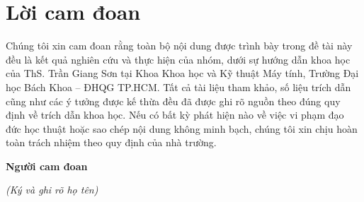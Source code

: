 \chapter*{Lời cam đoan}
\thispagestyle{empty}

Chúng tôi xin cam đoan rằng toàn bộ nội dung được trình bày trong đề tài này đều là kết quả nghiên cứu và thực hiện của nhóm, dưới sự hướng dẫn khoa học của ThS. Trần Giang Sơn tại Khoa Khoa học và Kỹ thuật Máy tính, Trường Đại học Bách Khoa – ĐHQG TP.HCM. Tất cả tài liệu tham khảo, số liệu trích dẫn cũng như các ý tưởng được kế thừa đều đã được ghi rõ nguồn theo đúng quy định về trích dẫn khoa học. Nếu có bất kỳ phát hiện nào về việc vi phạm đạo đức học thuật hoặc sao chép nội dung không minh bạch, chúng tôi xin chịu hoàn toàn trách nhiệm theo quy định của nhà trường.  

\vspace{1em}

\hspace{10.2cm}\textbf{Người cam đoan}

\vspace{2em}

\hspace{10cm} \textit{(Ký và ghi rõ họ tên)}

\clearpage
{}
